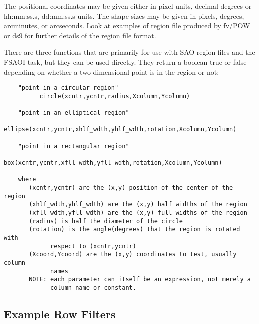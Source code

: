 \documentclass[11pt]{book}
\begin{document}
    The positional coordinates may be given either in pixel units,
    decimal degrees or hh:mm:ss.s, dd:mm:ss.s units.  The shape sizes
    may be given in pixels, degrees, arcminutes, or arcseconds.  Look
    at examples of region file produced by fv/POW or ds9 for further
    details of the region file format.

    There are three functions that are primarily for use with SAO region
    files and the  FSAOI  task, but they  can  be  used  directly.  They
    return  a  boolean true   or  false  depending   on  whether a   two
    dimensional point is in the region or not:

\begin{verbatim}
    "point in a circular region"
          circle(xcntr,ycntr,radius,Xcolumn,Ycolumn)

    "point in an elliptical region"
         ellipse(xcntr,ycntr,xhlf_wdth,yhlf_wdth,rotation,Xcolumn,Ycolumn)

    "point in a rectangular region"
             box(xcntr,ycntr,xfll_wdth,yfll_wdth,rotation,Xcolumn,Ycolumn)

    where
       (xcntr,ycntr) are the (x,y) position of the center of the region
       (xhlf_wdth,yhlf_wdth) are the (x,y) half widths of the region
       (xfll_wdth,yfll_wdth) are the (x,y) full widths of the region
       (radius) is half the diameter of the circle
       (rotation) is the angle(degrees) that the region is rotated with
             respect to (xcntr,ycntr)
       (Xcoord,Ycoord) are the (x,y) coordinates to test, usually column
             names
       NOTE: each parameter can itself be an expression, not merely a
             column name or constant.
\end{verbatim}


\subsection{Example Row Filters}
\end{document}
